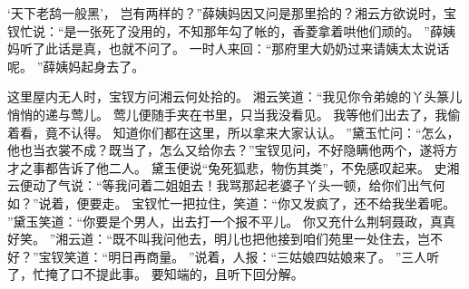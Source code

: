 ‘天下老鸹一般黑’，
岂有两样的？”薛姨妈因又问是那里拾的？湘云方欲说时，宝钗忙说：“是一张死了没用的，不知那年勾了帐的，香菱拿着哄他们顽的。
”薛姨妈听了此话是真，也就不问了。
一时人来回：“那府里大奶奶过来请姨太太说话呢。
”薛姨妈起身去了。
\par
这里屋内无人时，宝钗方问湘云何处拾的。
湘云笑道：“我见你令弟媳的丫头篆儿悄悄的递与莺儿。
莺儿便随手夹在书里，只当我没看见。
我等他们出去了，我偷着看，竟不认得。
知道你们都在这里，所以拿来大家认认。
”黛玉忙问：“怎么，他也当衣裳不成？既当了，怎么又给你去？”宝钗见问，不好隐瞒他两个，遂将方才之事都告诉了他二人。
黛玉便说“兔死狐悲，物伤其类”，不免感叹起来。
史湘云便动了气说：“等我问着二姐姐去！我骂那起老婆子丫头一顿，给你们出气何如？”说着，便要走。
宝钗忙一把拉住，笑道：“你又发疯了，还不给我坐着呢。
”黛玉笑道：“你要是个男人，出去打一个报不平儿。
你又充什么荆轲聂政，真真好笑。
”湘云道：“既不叫我问他去，明儿也把他接到咱们苑里一处住去，岂不好？”宝钗笑道：“明日再商量。
”说着，人报：“三姑娘四姑娘来了。
”三人听了，忙掩了口不提此事。
要知端的，且听下回分解。
\par
{}
